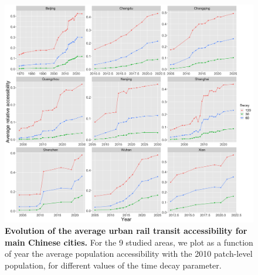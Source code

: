 \begin{figure}
	\includegraphics[width=\textwidth]{figures/avgaccess_facet.png}
	\caption{\textbf{Evolution of the average urban rail transit accessibility for main Chinese cities.} For the 9 studied areas, we plot as a function of year the average population accessibility with the 2010 patch-level population, for different values of the time decay parameter. \label{fig:tcaccessavg}}
\end{figure}


